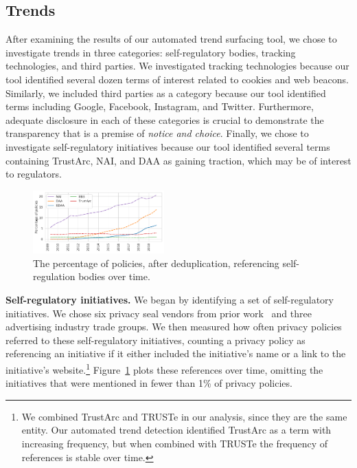 \subsection{Trends}
\label{subsec:trends}

After examining the results of our automated trend surfacing tool, we chose to investigate trends in three categories: self-regulatory bodies, tracking technologies, and third parties. We investigated tracking technologies because our tool identified several dozen terms of interest related to cookies and web beacons. Similarly, we included third parties as a category because our tool identified terms including Google, Facebook, Instagram, and Twitter. Furthermore, adequate disclosure in each of these categories is crucial to demonstrate the transparency that is a premise of \textit{notice and choice}. Finally, we chose to investigate self-regulatory initiatives because our tool identified several terms containing TrustArc, NAI, and DAA as gaining traction, which may be of interest to regulators.


\begin{figure}
    \centering
    \includegraphics[width=0.45\textwidth]{figures/selfreg.pdf}
    \caption{The percentage of policies, after deduplication, referencing self-regulation bodies over time. }
    
    \label{fig:selfreg}
\end{figure}


\textbf{Self-regulatory initiatives.} 
We began by identifying a set of self-regulatory initiatives. We chose six privacy seal vendors from prior work~\cite{rodrigues2013developing} and three advertising industry trade groups. We then measured how often privacy policies referred to these self-regulatory initiatives, counting a privacy policy as referencing an initiative if it either included the initiative's name or a link to the initiative's website.\footnote{We combined TrustArc and TRUSTe in our analysis, since they are the same entity. Our automated trend detection identified TrustArc as a term with increasing frequency, but when combined with TRUSTe the frequency of references is stable over time.} Figure~\ref{fig:selfreg} plots these references over time, omitting the initiatives that were mentioned in fewer than 1\% of privacy policies.

